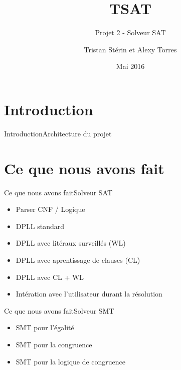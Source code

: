 \documentclass{beamer}
\title{TSAT}
\subtitle{Projet 2 - Solveur SAT}
\author{Tristan Stérin et Alexy Torres}
\institute{ENS Lyon}
\date{Mai 2016}
\begin{document}
    \begin{frame}
        \titlepage
    \end{frame}
    
    \frame{\tableofcontents}

    \section{Introduction}
        \begin{frame}{Introduction}{Architecture du projet}
        \end{frame}
        
    \section{Ce que nous avons fait}
        \begin{frame}{Ce que nous avons fait}{Solveur SAT}
            \begin{itemize}
                \item Parser CNF / Logique
                \item DPLL standard 
                \item DPLL avec litéraux surveillés (WL)
                \item DPLL avec aprentissage de clauses (CL)
                \item DPLL avec CL + WL
                \item Intération avec l'utilisateur durant la résolution
            \end{itemize}
        \end{frame}

        \begin{frame}{Ce que nous avons fait}{Solveur SMT}
            \begin{itemize}
                \item SMT pour l'égalité
                \item SMT pour la congruence
                \item SMT pour la logique de congruence
            \end{itemize}
        \end{frame}
\end{document}
